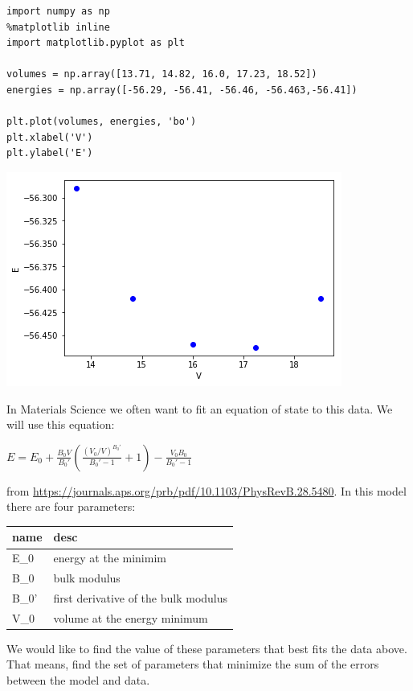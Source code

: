 \documentclass[11pt]{article}
\begin{document}
\begin{verbatim}
import numpy as np
%matplotlib inline
import matplotlib.pyplot as plt

volumes = np.array([13.71, 14.82, 16.0, 17.23, 18.52])
energies = np.array([-56.29, -56.41, -56.46, -56.463,-56.41])

plt.plot(volumes, energies, 'bo')
plt.xlabel('V')
plt.ylabel('E')
\end{verbatim}

\begin{center}
\includegraphics[width=.9\linewidth]{obipy-resources/513154bd4a2746455cb8d249e9b62785-85168upj.png}
\end{center}

In Materials Science we often want to fit an equation of state to this data. We will use this equation:

\(E = E_0 + \frac{B_0 V}{B_0'}\left(\frac{(V_0 / V)^{B_0'}}{B_0' - 1} + 1 \right) - \frac{V_0 B_0}{B_0' - 1}\)

from \url{https://journals.aps.org/prb/pdf/10.1103/PhysRevB.28.5480}. In this model there are four parameters:

\begin{center}
\begin{tabular}{ll}
name & desc\\
\hline
E\_0 & energy at the minimim\\
B\_0 & bulk modulus\\
B\_0' & first derivative of the bulk modulus\\
V\_0 & volume at the energy minimum\\
\end{tabular}
\end{center}

We would like to find the value of these parameters that best fits the data above. That means, find the set of parameters that minimize the sum of the errors between the model and data.
\end{document}
